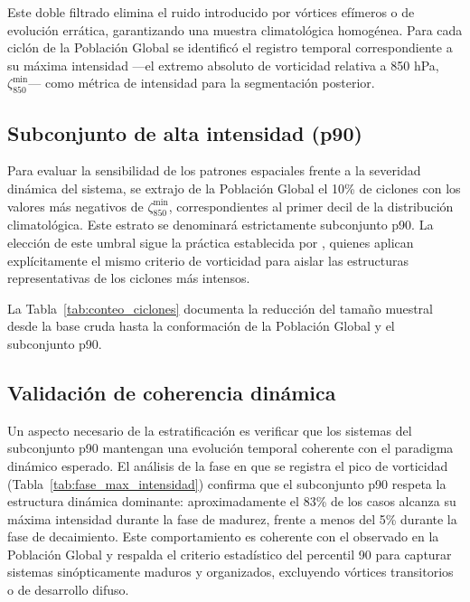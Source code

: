 Este doble filtrado elimina el ruido introducido por vórtices efímeros o de evolución errática, garantizando una muestra climatológica homogénea. Para cada ciclón de la Población Global se identificó el registro temporal correspondiente a su máxima intensidad —el extremo absoluto de vorticidad relativa a 850 hPa, $\zeta_{850}^{\min}$— como métrica de intensidad para la segmentación posterior.

\subsection{Subconjunto de alta intensidad (p90)}\label{subsec:subconjuntos_intensidad}

Para evaluar la sensibilidad de los patrones espaciales frente a la severidad dinámica del sistema, se extrajo de la Población Global el 10\% de ciclones con los valores más negativos de $\zeta_{850}^{\min}$, correspondientes al primer decil de la distribución climatológica. Este estrato se denominará estrictamente subconjunto p90. La elección de este umbral sigue la práctica establecida por \citet{priestley2022improved}, quienes aplican explícitamente el mismo criterio de vorticidad para aislar las estructuras representativas de los ciclones más intensos.

La Tabla~\ref{tab:conteo_ciclones} documenta la reducción del tamaño muestral desde la base cruda hasta la conformación de la Población Global y el subconjunto p90.



\subsection{Validación de coherencia dinámica}\label{subsec:validacao_selecao}

Un aspecto necesario de la estratificación es verificar que los sistemas del subconjunto p90 mantengan una evolución temporal coherente con el paradigma dinámico esperado. El análisis de la fase en que se registra el pico de vorticidad (Tabla~\ref{tab:fase_max_intensidad}) confirma que el subconjunto p90 respeta la estructura dinámica dominante: aproximadamente el 83\% de los casos alcanza su máxima intensidad durante la fase de madurez, frente a menos del 5\% durante la fase de decaimiento. Este comportamiento es coherente con el observado en la Población Global y respalda el criterio estadístico del percentil 90 para capturar sistemas sinópticamente maduros y organizados, excluyendo vórtices transitorios o de desarrollo difuso.

